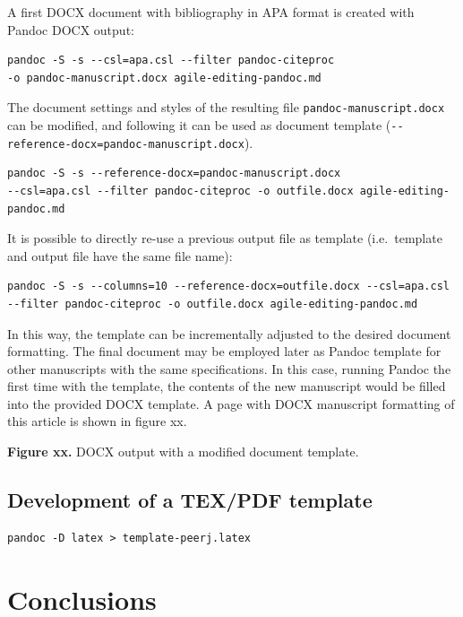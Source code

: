 \documentclass[10pt,fleq]{wlpeerj}
\begin{document}
A first
DOCX
document
with
bibliography
in APA
format is
created
with
Pandoc
DOCX
output:

\begin{verbatim}
pandoc -S -s --csl=apa.csl --filter pandoc-citeproc
-o pandoc-manuscript.docx agile-editing-pandoc.md
\end{verbatim}

The
document
settings
and styles
of the
resulting
file
\texttt{pandoc-manuscript.docx}
can be
modified,
and
following
it can be
used as
document
template
(\texttt{-\/-reference-docx=pandoc-manuscript.docx}).

\begin{verbatim}
pandoc -S -s --reference-docx=pandoc-manuscript.docx
--csl=apa.csl --filter pandoc-citeproc -o outfile.docx agile-editing-pandoc.md
\end{verbatim}

It is
possible
to
directly
re-use a
previous
output
file as
template
(i.e.~template
and output
file have
the same
file
name):

\begin{verbatim}
pandoc -S -s --columns=10 --reference-docx=outfile.docx --csl=apa.csl --filter pandoc-citeproc -o outfile.docx agile-editing-pandoc.md
\end{verbatim}

In this
way, the
template
can be
incrementally
adjusted
to the
desired
document
formatting.
The final
document
may be
employed
later as
Pandoc
template
for other
manuscripts
with the
same
specifications.
In this
case,
running
Pandoc the
first time
with the
template,
the
contents
of the new
manuscript
would be
filled
into the
provided
DOCX
template.
A page
with DOCX
manuscript
formatting
of this
article is
shown in
figure xx.

\textbf{Figure
xx.} DOCX
output
with a
modified
document
template.

\subsection{Development
of a
TEX/PDF
template}\label{development-of-a-texpdf-template}

\begin{verbatim}
pandoc -D latex > template-peerj.latex
\end{verbatim}

\section{Conclusions}\label{conclusions}
\end{document}
